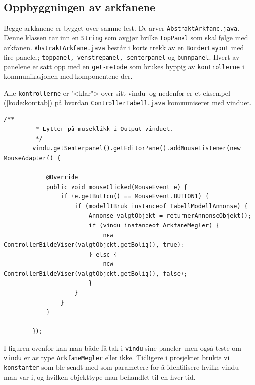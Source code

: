 \subsection{Oppbyggningen av arkfanene}
Begge arkfanene er bygget over samme lest. De arver \texttt{AbstraktArkfane.java}. Denne klassen tar inn en \texttt{String} som avgjør hvilke \texttt{topPanel} som skal følge med arkfanen.
\texttt{AbstraktArkfane.java} består i korte trekk av en \texttt{BorderLayout} med fire paneler; \texttt{toppanel, venstrepanel, senterpanel} og \texttt{bunnpanel}.
Hvert av panelene er satt opp med en \texttt{get-metode} som brukes hyppig av \texttt{kontrollerne} i kommunikasjonen med komponentene der.

Alle \texttt{kontrollerne} er "<klar"> over sitt vindu, og nedenfor er et eksempel (\ref{kode:konttab}) på hvordan \texttt{ControllerTabell.java} kommuniserer med vinduet.

\begin{lstlisting}[caption=\texttt{ControllerTabell.java} kommunikasjon med brukergrensesnitt.,label=kode:konttab]
        /**
         * Lytter på museklikk i Output-vinduet.
         */
        vindu.getSenterpanel().getEditorPane().addMouseListener(new MouseAdapter() {

            @Override
            public void mouseClicked(MouseEvent e) {
                if (e.getButton() == MouseEvent.BUTTON1) {
                    if (modellIBruk instanceof TabellModellAnnonse) {
                        Annonse valgtObjekt = returnerAnnonseObjekt();
                        if (vindu instanceof ArkfaneMegler) {
                            new ControllerBildeViser(valgtObjekt.getBolig(), true);
                        } else {
                            new ControllerBildeViser(valgtObjekt.getBolig(), false);
                        }
                    }
                }
            }

        });
\end{lstlisting}

I figuren ovenfor kan man både få tak i \texttt{vindu} sine paneler, men også teste om \texttt{vindu} er av type \texttt{ArkfaneMegler} eller ikke. Tidligere i prosjektet brukte vi \texttt{konstanter} som ble sendt med som parametere for å identifisere hvilke vindu man var i, og hvilken objekttype man behandlet til en hver tid.


